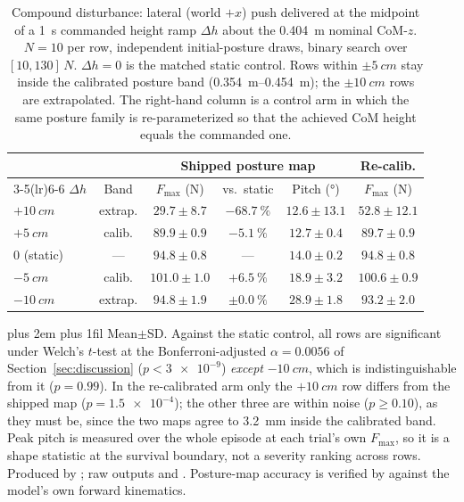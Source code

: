 \documentclass[a4paper,fleqn]{cas-dc}
\newcommand{\tabnote}{\par\leftskip=0pt\rightskip=0pt plus 2em%
  \parfillskip=0pt plus 1fil\relax}
\begin{document}
\begin{table}[pos=!tbp]
\centering
\caption{Compound disturbance: lateral (world $+x$) push delivered at the midpoint of a
\SI{1}{s} commanded height ramp $\Delta h$ about the \SI{0.404}{m} nominal
CoM-$z$. $N{=}10$ per row, independent initial-posture draws, binary search over
$[10,130]\,\si{N}$. $\Delta h{=}0$ is the matched static control. Rows within
$\pm\SI{5}{cm}$ stay inside the calibrated posture band
(\SIrange{0.354}{0.454}{m}); the $\pm\SI{10}{cm}$ rows are extrapolated. The
right-hand column is a control arm in which the same posture family is
re-parameterized so that the achieved CoM height equals the commanded one.}
\label{tab:compound}
\footnotesize
\setlength{\tabcolsep}{3pt}\begin{tabular}{@{}lccccc@{}}
\toprule
& & \multicolumn{3}{c}{Shipped posture map} & Re-calib. \\
\cmidrule(lr){3-5}\cmidrule(lr){6-6}
$\Delta h$ & Band & $F_{\max}$ (N) & vs.\ static & Pitch (\si{\degree}) & $F_{\max}$ (N) \\
\midrule
$+\SI{10}{cm}$ & extrap. & $29.7\pm8.7$  & $-\SI{68.7}{\percent}$ & $12.6\pm13.1$ & $52.8\pm12.1$ \\
$+\SI{5}{cm}$  & calib.  & $89.9\pm0.9$  & $-\SI{5.1}{\percent}$ & $12.7\pm0.4$ & $89.7\pm0.9$ \\
$0$ (static)   & ---     & $\mathbf{94.8\pm0.8}$ & --- & $14.0\pm0.2$ & $\mathbf{94.8\pm0.8}$ \\
$-\SI{5}{cm}$  & calib.  & $101.0\pm1.0$  & $+\SI{6.5}{\percent}$ & $18.9\pm3.2$ & $100.6\pm0.9$ \\
$-\SI{10}{cm}$ & extrap. & $94.8\pm1.9$  & $\pm\SI{0.0}{\percent}$ & $28.9\pm1.8$ & $93.2\pm2.0$ \\
\bottomrule
\end{tabular}
\vspace{2pt}\tabnote\noindent
Mean$\pm$SD. Against the static control, all rows are significant under Welch's
$t$-test at the Bonferroni-adjusted $\alpha{=}0.0056$ of Section~\ref{sec:discussion}
($p{<}\num{3e-9}$) \emph{except} $-\SI{10}{cm}$, which is indistinguishable from
it ($p{=}0.99$). In the re-calibrated arm only the $+\SI{10}{cm}$ row differs
from the shipped map ($p{=}\num{1.5e-4}$); the other three are within noise
($p{\geq}0.10$), as they must be, since the two maps agree to
\SI{3.2}{mm} inside the calibrated band. Peak pitch is measured over the
whole episode at each trial's own $F_{\max}$, so it is a shape statistic at the
survival boundary, not a severity ranking across rows. Produced by
; raw outputs
 and
. Posture-map accuracy is verified by
 against the model's own forward kinematics.
\end{table}
\end{document}
